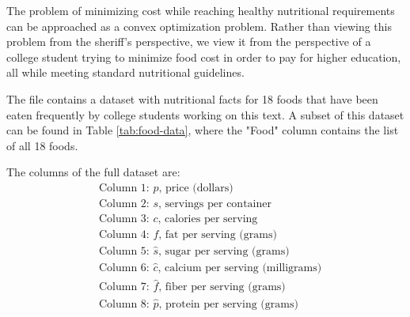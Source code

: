 The problem of minimizing cost while reaching healthy nutritional requirements can be approached as a convex optimization problem.
Rather than viewing this problem from the sheriff's perspective, we view it from the perspective of a college student trying to minimize food cost in order to pay for higher education, all while meeting standard nutritional guidelines.

The file  contains a dataset with nutritional facts for 18 foods that have been eaten frequently by college students working on this text.
A subset of this dataset can be found in Table \ref{tab:food-data}, where the "Food" column contains the list of all 18 foods.

The columns of the full dataset are:
\begin{align*}
& \text{Column 1: $p$, price (dollars)} \\
& \text{Column 2: $s$, servings per container} \\
& \text{Column 3: $c$, calories per serving} \\
& \text{Column 4: $f$, fat per serving (grams)} \\
& \text{Column 5: $\hat{s}$, sugar per serving (grams)} \\
& \text{Column 6: $\hat{c}$, calcium per serving (milligrams)} \\
& \text{Column 7: $\hat{f}$, fiber per serving (grams)} \\
& \text{Column 8: $\hat{p}$, protein per serving (grams)}
\end{align*}

